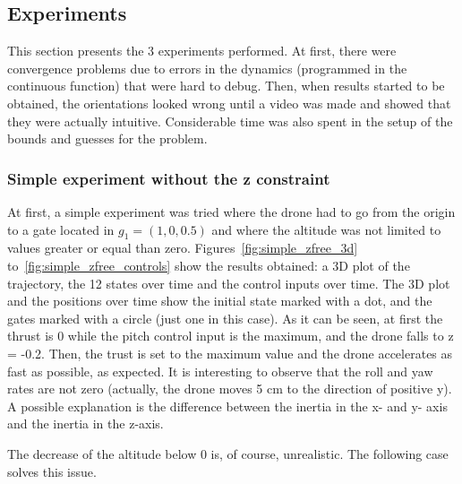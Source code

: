 \documentclass[letterpaper, 10 pt, conference]{ieeeconf}  %
\begin{document}
\subsection{Experiments}

This section presents the 3 experiments performed. At first, there were convergence problems due to errors in the dynamics (programmed in the continuous function) that were hard to debug. Then, when results started to be obtained, the orientations looked wrong until a video was made and showed that they were actually intuitive. Considerable time was also spent in the setup of the bounds and guesses for the problem.

\subsubsection{Simple experiment without the z constraint}
At first, a simple experiment was tried where the drone had to go from the origin to a gate located in $g_1=(1, 0, 0.5)$ and where the altitude was not limited to values greater or equal than zero. Figures~\ref{fig:simple_zfree_3d} to~\ref{fig:simple_zfree_controls} show the results obtained: a 3D plot of the trajectory, the 12 states over time and the control inputs over time. The 3D plot and the positions over time show the initial state marked with a dot, and the gates marked with a circle (just one in this case). As it can be seen, at first the thrust is 0 while the pitch control input is the maximum, and the drone falls to z = -0.2. Then, the trust is set to the maximum value and the drone accelerates as fast as possible, as expected. It is interesting to observe that the roll and yaw rates are not zero (actually, the drone moves 5 cm to the direction of positive y). A possible explanation is the difference between the inertia in the x- and y- axis and the inertia in the z-axis.

The decrease of the altitude below 0 is, of course, unrealistic. The following case solves this issue.
\end{document}
